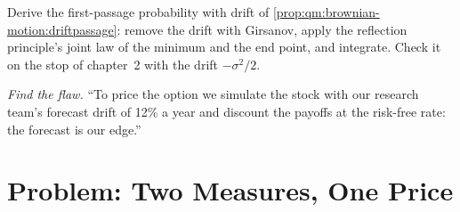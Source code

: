 \begin{exercise}[$\star\star\star$]\label{exo:qm:girsanov-and-changes-of-numeraire:7}
Derive the first-passage probability with drift of \cref{prop:qm:brownian-motion:driftpassage}: remove
the drift with Girsanov, apply the reflection principle's joint law of the minimum and the end
point, and integrate. Check it on the stop of chapter~2 with the drift $-\sigma^2/2$.
\end{exercise}

\begin{exercise}[$\star\star\star$]\label{exo:qm:girsanov-and-changes-of-numeraire:8}
\emph{Find the flaw.} ``To price the option we simulate the stock with our research team's
forecast drift of 12\% a year and discount the payoffs at the risk-free rate: the forecast is our
edge.''
\end{exercise}

\section{Problem: Two Measures, One Price}

